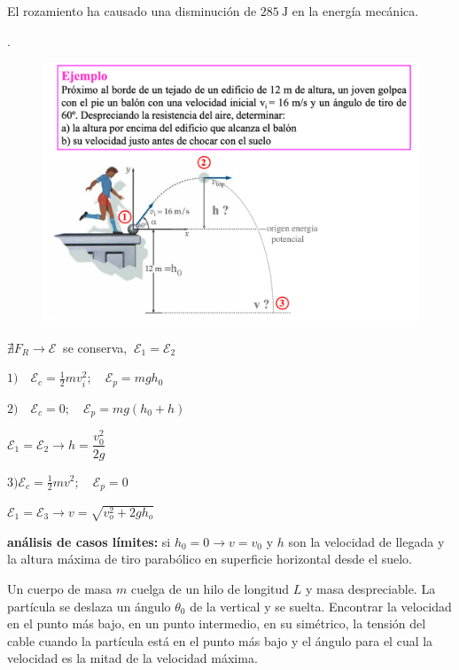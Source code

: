   El rozamiento ha causado una disminución de $285\ \mathrm{J}$ en la energía mecánica.
 
 
 
 \begin{prob}.
	\begin{figure}[H]
	\centering
	\includegraphics[width=1\textwidth]{imagenes/imagenes04/T04IM06.png}
\end{figure}
\end{prob}

 $  \nexists F_R \to \mathcal E \ $ se conserva, $\ \mathcal E_1=\mathcal E_2$
 
 $1)\quad \mathcal E_c=\frac 1 2 m v_i^2; \quad  \mathcal E_p=mgh_0 $
 
 $2)\quad \mathcal E_c=0; \quad  \mathcal E_p=mg(h_0+h)$
 
 $ \mathcal E_1= \mathcal E_2 \to h=\dfrac {v_0^2}{2g}$
 
 $3) \mathcal E_c=\frac 1 2 m v^2; \quad  \mathcal E_p=0$
 
 $  \mathcal E_1= \mathcal E_3 \to v=\sqrt{v_o^2+2gh_o}$
 
 \textbf{análisis de casos límites:} si $h_0=0 \to v=v_0$ y $h$ son la velocidad de llegada y la altura máxima de tiro parabólico en superficie horizontal desde el suelo.



\begin{prob}
Un cuerpo de masa $m$ cuelga de un hilo de longitud $L$ y masa despreciable. La partícula se deslaza un ángulo $\theta_0$ de la vertical y se suelta. Encontrar la velocidad en el punto más bajo, en un punto intermedio, en su simétrico, la tensión del cable cuando la partícula está en el punto más bajo y el ángulo para el cual la velocidad es la mitad de la velocidad máxima.
\end{prob}

